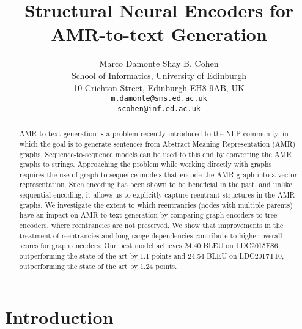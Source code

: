 \documentclass[11pt,a4paper]{article}
\title{Structural Neural Encoders for AMR-to-text Generation}
\author{Marco Damonte
  \quad Shay B. Cohen
  \\ \normalsize{School of
    Informatics, University of Edinburgh}\\ \normalsize{10 Crichton Street,
    Edinburgh EH8 9AB, UK}
  \\ \tt{m.damonte@sms.ed.ac.uk} \\
  \tt{scohen@inf.ed.ac.uk}}
\date{}
\begin{document}
\maketitle
\begin{abstract}
AMR-to-text generation is a problem recently introduced to the NLP community, in which the goal is to generate sentences from Abstract Meaning Representation (AMR) graphs. 
Sequence-to-sequence models can be used to this end by converting the AMR graphs to strings.
Approaching the problem while working directly with graphs requires the use of graph-to-sequence models that encode the AMR graph into a vector representation.
Such encoding has been shown to be beneficial in the past, and unlike sequential encoding, it allows us to explicitly capture reentrant structures in the AMR graphs.
We investigate the extent to which reentrancies (nodes with multiple parents) have an impact on AMR-to-text generation by comparing graph encoders to tree encoders, where reentrancies are not preserved. We show that improvements in the treatment of reentrancies and long-range dependencies contribute to higher overall scores for graph encoders.
Our best model achieves 24.40 BLEU on LDC2015E86, outperforming the state of the art by 1.1 points and 24.54 BLEU on LDC2017T10, outperforming the state of the art by 1.24 points.

\end{abstract}

\section{Introduction}
\end{document}
